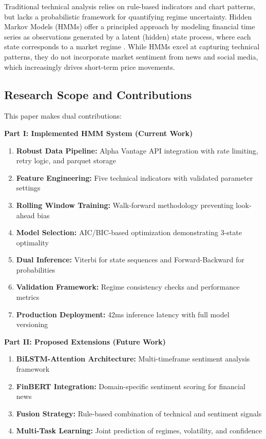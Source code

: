 \documentclass[conference]{IEEEtran}
\begin{document}
Traditional technical analysis relies on rule-based indicators and chart patterns, but lacks a probabilistic framework for quantifying regime uncertainty. Hidden Markov Models (HMMs) offer a principled approach by modeling financial time series as observations generated by a latent (hidden) state process, where each state corresponds to a market regime \cite{hassan2005, kritzman2012}. While HMMs excel at capturing technical patterns, they do not incorporate market sentiment from news and social media, which increasingly drives short-term price movements.

\subsection{Research Scope and Contributions}

This paper makes dual contributions:

\textbf{Part I: Implemented HMM System (Current Work)}
\begin{enumerate}
\item \textbf{Robust Data Pipeline:} Alpha Vantage API integration with rate limiting, retry logic, and parquet storage
\item \textbf{Feature Engineering:} Five technical indicators with validated parameter settings
\item \textbf{Rolling Window Training:} Walk-forward methodology preventing look-ahead bias
\item \textbf{Model Selection:} AIC/BIC-based optimization demonstrating 3-state optimality
\item \textbf{Dual Inference:} Viterbi for state sequences and Forward-Backward for probabilities
\item \textbf{Validation Framework:} Regime consistency checks and performance metrics
\item \textbf{Production Deployment:} 42ms inference latency with full model versioning
\end{enumerate}

\textbf{Part II: Proposed Extensions (Future Work)}
\begin{enumerate}
\item \textbf{BiLSTM-Attention Architecture:} Multi-timeframe sentiment analysis framework
\item \textbf{FinBERT Integration:} Domain-specific sentiment scoring for financial news
\item \textbf{Fusion Strategy:} Rule-based combination of technical and sentiment signals
\item \textbf{Multi-Task Learning:} Joint prediction of regimes, volatility, and confidence
\end{enumerate}
\end{document}
